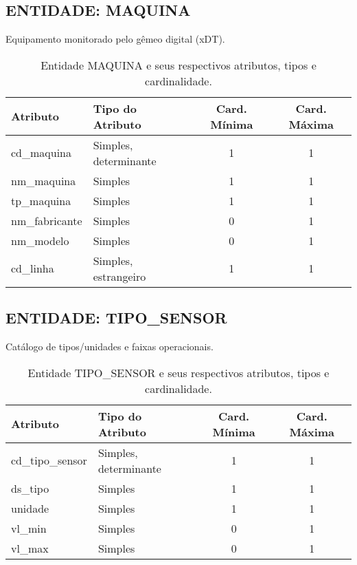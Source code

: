 \documentclass[10pt,a4paper]{article}
\begin{document}
\subsection*{ENTIDADE: MAQUINA}
Equipamento monitorado pelo gêmeo digital (xDT).

\begin{table}[h!]
\centering
\begin{tabular}{| l | l | c | c |}
\hline
\rowcolor{red}\color{white}\textbf{Atributo} & \color{white}\textbf{Tipo do Atributo} & \color{white}\textbf{Card. Mínima} & \color{white}\textbf{Card. Máxima} \\
\hline
cd\_maquina & Simples, determinante & 1 & 1 \\
nm\_maquina & Simples & 1 & 1 \\
tp\_maquina & Simples & 1 & 1 \\
nm\_fabricante & Simples & 0 & 1 \\
nm\_modelo & Simples & 0 & 1 \\
cd\_linha & Simples, estrangeiro & 1 & 1 \\
\hline
\end{tabular}
\caption{Entidade MAQUINA e seus respectivos atributos, tipos e cardinalidade.}
\label{tab:maquina}
\end{table}

\subsection*{ENTIDADE: TIPO\_SENSOR}
Catálogo de tipos/unidades e faixas operacionais.

\begin{table}[h!]
\centering
\begin{tabular}{| l | l | c | c |}
\hline
\rowcolor{red}\color{white}\textbf{Atributo} & \color{white}\textbf{Tipo do Atributo} & \color{white}\textbf{Card. Mínima} & \color{white}\textbf{Card. Máxima} \\
\hline
cd\_tipo\_sensor & Simples, determinante & 1 & 1 \\
ds\_tipo & Simples & 1 & 1 \\
unidade & Simples & 1 & 1 \\
vl\_min & Simples & 0 & 1 \\
vl\_max & Simples & 0 & 1 \\
\hline
\end{tabular}
\caption{Entidade TIPO\_SENSOR e seus respectivos atributos, tipos e cardinalidade.}
\label{tab:tipo_sensor}
\end{table}
\end{document}
